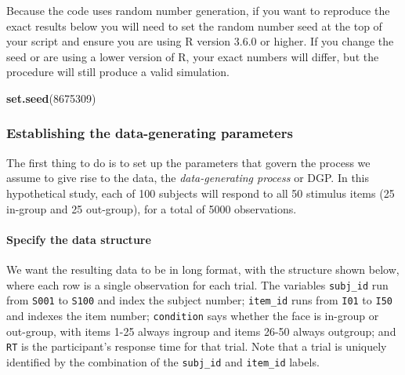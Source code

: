 \documentclass[man,floatsintext]{apa6}
\newenvironment{Shaded}{\begin{snugshade}}{\end{snugshade}}
\newcommand{\KeywordTok}[1]{\textcolor[rgb]{0.13,0.29,0.53}{\textbf{#1}}}
\newcommand{\DecValTok}[1]{\textcolor[rgb]{0.00,0.00,0.81}{#1}}
\newcommand{\NormalTok}[1]{#1}
\let\oldparagraph\paragraph
\renewcommand{\paragraph}[1]{\oldparagraph{#1}\mbox{}}
\begin{document}
Because the code uses random number generation, if you want to reproduce
the exact results below you will need to set the random number seed at
the top of your script and ensure you are using R version 3.6.0 or
higher. If you change the seed or are using a lower version of R, your
exact numbers will differ, but the procedure will still produce a valid
simulation.

\begin{Shaded}
\begin{Highlighting}[]
\KeywordTok{set.seed}\NormalTok{(}\DecValTok{8675309}\NormalTok{)}
\end{Highlighting}
\end{Shaded}

\subsubsection{Establishing the data-generating
parameters}\label{establishing-the-data-generating-parameters}

The first thing to do is to set up the parameters that govern the
process we assume to give rise to the data, the \emph{data-generating
process} or DGP. In this hypothetical study, each of 100 subjects will
respond to all 50 stimulus items (25 in-group and 25 out-group), for a
total of 5000 observations.

\paragraph{Specify the data structure}\label{specify-the-data-structure}

We want the resulting data to be in long format, with the structure
shown below, where each row is a single observation for each trial. The
variables \texttt{subj\_id} run from \texttt{S001} to \texttt{S100} and
index the subject number; \texttt{item\_id} runs from \texttt{I01} to
\texttt{I50} and indexes the item number; \texttt{condition} says
whether the face is in-group or out-group, with items 1-25 always
ingroup and items 26-50 always outgroup; and \texttt{RT} is the
participant's response time for that trial. Note that a trial is
uniquely identified by the combination of the \texttt{subj\_id} and
\texttt{item\_id} labels.
\end{document}
